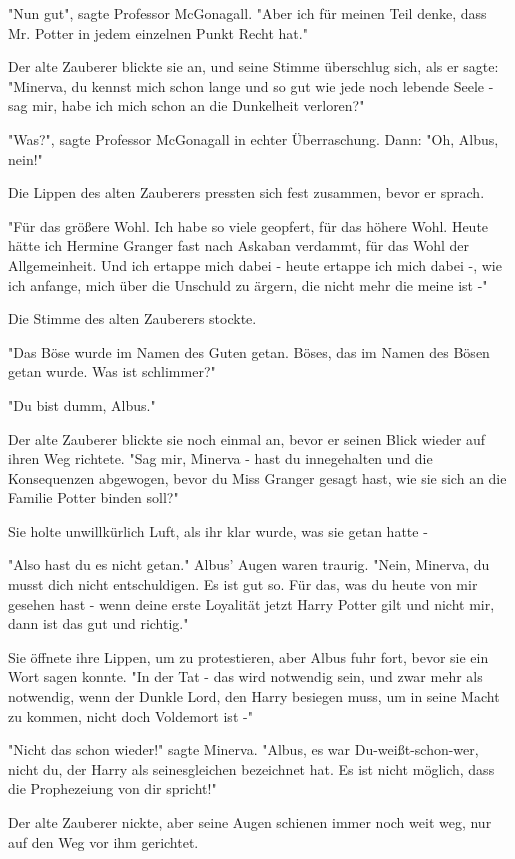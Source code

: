 {"Nun gut", sagte Professor McGonagall. "Aber ich für meinen Teil denke, dass Mr. Potter in jedem einzelnen Punkt Recht hat."

Der alte Zauberer blickte sie an, und seine Stimme überschlug sich, als er sagte: "Minerva, du kennst mich schon lange und so gut wie jede noch lebende Seele - sag mir, habe ich mich schon an die Dunkelheit verloren?"

"Was?", sagte Professor McGonagall in echter Überraschung. Dann: "Oh, Albus, nein!"

Die Lippen des alten Zauberers pressten sich fest zusammen, bevor er sprach.

"Für das größere Wohl. Ich habe so viele geopfert, für das höhere Wohl. Heute hätte ich Hermine Granger fast nach Askaban verdammt, für das Wohl der Allgemeinheit. Und ich ertappe mich dabei - heute ertappe ich mich dabei -, wie ich anfange, mich über die Unschuld zu ärgern, die nicht mehr die meine ist -"

Die Stimme des alten Zauberers stockte.

"Das Böse wurde im Namen des Guten getan. Böses, das im Namen des Bösen getan wurde. Was ist schlimmer?"

"Du bist dumm, Albus."

Der alte Zauberer blickte sie noch einmal an, bevor er seinen Blick wieder auf ihren Weg richtete. "Sag mir, Minerva - hast du innegehalten und die Konsequenzen abgewogen, bevor du Miss Granger gesagt hast, wie sie sich an die Familie Potter binden soll?"

Sie holte unwillkürlich Luft, als ihr klar wurde, was sie getan hatte -

"Also hast du es nicht getan." Albus' Augen waren traurig. "Nein, Minerva, du musst dich nicht entschuldigen. Es ist gut so. Für das, was du heute von mir gesehen hast - wenn deine erste Loyalität jetzt Harry Potter gilt und nicht mir, dann ist das gut und richtig."

Sie öffnete ihre Lippen, um zu protestieren, aber Albus fuhr fort, bevor sie ein Wort sagen konnte. "In der Tat - das wird notwendig sein, und zwar mehr als notwendig, wenn der Dunkle Lord, den Harry besiegen muss, um in seine Macht zu kommen, nicht doch Voldemort ist -"

"Nicht das schon wieder!" sagte Minerva. "Albus, es war Du-weißt-schon-wer, nicht du, der Harry als seinesgleichen bezeichnet hat. Es ist nicht möglich, dass die Prophezeiung von dir spricht!"

Der alte Zauberer nickte, aber seine Augen schienen immer noch weit weg, nur auf den Weg vor ihm gerichtet.

}
